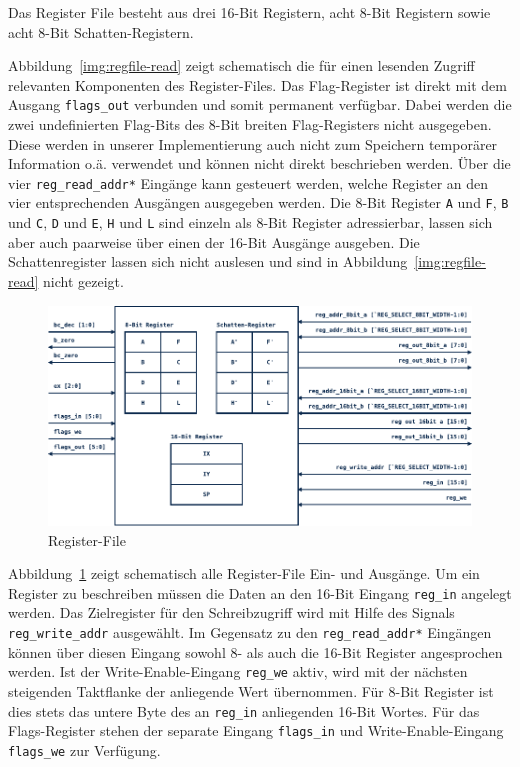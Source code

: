 \documentclass[ngerman, cd=lightcolor]{tudscrreprt}
\begin{document}
\noindent
Das Register File besteht aus drei 16-Bit Registern, acht 8-Bit Registern
sowie acht 8-Bit Schatten-Registern.

Abbildung~\ref{img:regfile-read} zeigt schematisch die für einen lesenden
Zugriff relevanten Komponenten des Register-Files. Das Flag-Register ist direkt
mit dem Ausgang \texttt{flags\_out} verbunden und somit permanent verfügbar.
Dabei werden die zwei undefinierten Flag-Bits des 8-Bit breiten Flag-Registers
nicht ausgegeben. Diese werden in unserer Implementierung auch nicht zum
Speichern temporärer Information o.ä. verwendet und können nicht direkt
beschrieben werden. Über die vier \texttt{reg\_read\_addr*} Eingänge kann
gesteuert werden, welche Register an den vier entsprechenden Ausgängen
ausgegeben werden. Die 8-Bit Register \texttt{A} und \texttt{F}, \texttt{B} und
\texttt{C}, \texttt{D} und \texttt{E}, \texttt{H} und \texttt{L} sind einzeln
als 8-Bit Register adressierbar, lassen sich aber auch paarweise über einen der
16-Bit Ausgänge ausgeben. Die Schattenregister lassen sich nicht auslesen und
sind in Abbildung~\ref{img:regfile-read} nicht gezeigt.

\begin{figure}[htbp]
  \centering
    \includegraphics[width=\textwidth]{resources/pdf/regfile.pdf}
  \caption{Register-File}
  \label{img:regfile}
\end{figure}

\noindent
Abbildung~\ref{img:regfile} zeigt schematisch alle Register-File Ein- und
Ausgänge. Um ein Register zu beschreiben müssen die Daten an den 16-Bit
Eingang \texttt{reg\_in} angelegt werden. Das Zielregister für den
Schreibzugriff wird mit Hilfe des Signals \texttt{reg\_write\_addr} ausgewählt.
Im Gegensatz zu den \texttt{reg\_read\_addr*} Eingängen können über diesen
Eingang sowohl 8- als auch die 16-Bit Register angesprochen werden.  Ist der
Write-Enable-Eingang \texttt{reg\_we} aktiv, wird mit der nächsten steigenden
Taktflanke der anliegende Wert übernommen. Für 8-Bit Register ist dies stets
das untere Byte des an \texttt{reg\_in} anliegenden 16-Bit Wortes.  Für das
Flags-Register stehen der separate Eingang \texttt{flags\_in} und
Write-Enable-Eingang \texttt{flags\_we} zur Verfügung.
\end{document}
